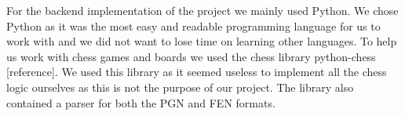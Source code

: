 \documentclass[11pt]{article}
\begin{document}
    For the backend implementation of the project we mainly used Python. We chose Python as it was the most easy and readable programming language for us to work with and we did not want to lose time on learning other languages. To help us work with chess games and boards we used the chess library python-chess [reference]. We used this library as it seemed useless to implement all the chess logic ourselves as this is not the purpose of our project. The library also contained a parser for both the PGN and FEN formats.

    

\end{document}
